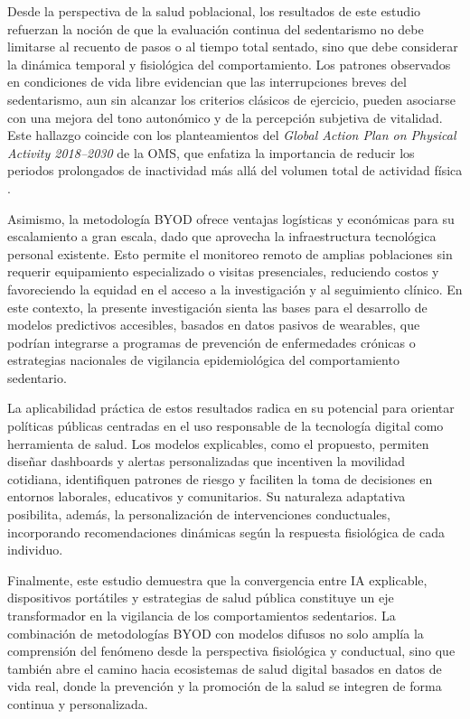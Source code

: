 Desde la perspectiva de la salud poblacional, los resultados de este estudio refuerzan la noción de que la evaluación continua del sedentarismo no debe limitarse al recuento de pasos o al tiempo total sentado, sino que debe considerar la dinámica temporal y fisiológica del comportamiento. Los patrones observados en condiciones de vida libre evidencian que las interrupciones breves del sedentarismo, aun sin alcanzar los criterios clásicos de ejercicio, pueden asociarse con una mejora del tono autonómico y de la percepción subjetiva de vitalidad. Este hallazgo coincide con los planteamientos del \textit{Global Action Plan on Physical Activity 2018--2030} de la OMS, que enfatiza la importancia de reducir los periodos prolongados de inactividad más allá del volumen total de actividad física \cite{WHO2018,Bull2020}.

Asimismo, la metodología BYOD ofrece ventajas logísticas y económicas para su escalamiento a gran escala, dado que aprovecha la infraestructura tecnológica personal existente. Esto permite el monitoreo remoto de amplias poblaciones sin requerir equipamiento especializado o visitas presenciales, reduciendo costos y favoreciendo la equidad en el acceso a la investigación y al seguimiento clínico. En este contexto, la presente investigación sienta las bases para el desarrollo de modelos predictivos accesibles, basados en datos pasivos de wearables, que podrían integrarse a programas de prevención de enfermedades crónicas o estrategias nacionales de vigilancia epidemiológica del comportamiento sedentario.

La aplicabilidad práctica de estos resultados radica en su potencial para orientar políticas públicas centradas en el uso responsable de la tecnología digital como herramienta de salud. Los modelos explicables, como el propuesto, permiten diseñar dashboards y alertas personalizadas que incentiven la movilidad cotidiana, identifiquen patrones de riesgo y faciliten la toma de decisiones en entornos laborales, educativos y comunitarios. Su naturaleza adaptativa posibilita, además, la personalización de intervenciones conductuales, incorporando recomendaciones dinámicas según la respuesta fisiológica de cada individuo.

Finalmente, este estudio demuestra que la convergencia entre IA explicable, dispositivos portátiles y estrategias de salud pública constituye un eje transformador en la vigilancia de los comportamientos sedentarios. La combinación de metodologías BYOD con modelos difusos no solo amplía la comprensión del fenómeno desde la perspectiva fisiológica y conductual, sino que también abre el camino hacia ecosistemas de salud digital basados en datos de vida real, donde la prevención y la promoción de la salud se integren de forma continua y personalizada.

